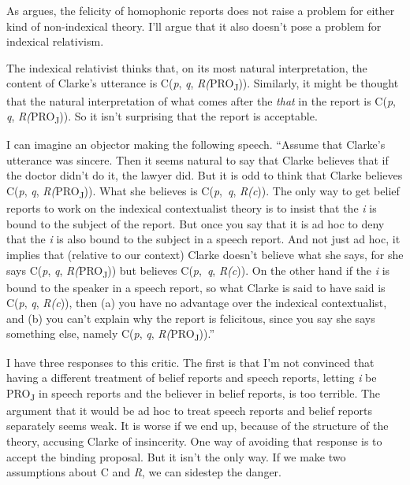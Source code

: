 As \cite{MacFarlane2009-MACNC} argues, the felicity of homophonic reports does not raise a problem for either kind of non-indexical theory. I'll argue that it also doesn't pose a problem for indexical relativism.

The indexical relativist thinks that, on its most natural interpretation, the content of Clarke's utterance is C(\textit{p}, \textit{q}, \textit{R(}PRO\textsubscript{J})). Similarly, it might be thought that the natural interpretation of what comes after the \textit{that} in the report is C(\textit{p}, \textit{q}, \textit{R(}PRO\textsubscript{J})). So it isn't surprising that the report is acceptable.

I can imagine an objector making the following speech. ``Assume that Clarke's utterance was sincere. Then it seems natural to say that Clarke believes that if the doctor didn't do it, the lawyer did. But it is odd to think that Clarke believes C(\textit{p}, \textit{q}, \textit{R(}PRO\textsubscript{J})). What she believes is C(\textit{p},~\textit{q}, \textit{R(c})). The only way to get belief reports to work on the indexical contextualist theory is to insist that the \textit{i} is bound to the subject of the report. But once you say that it is ad hoc to deny that the \textit{i} is also bound to the subject in a speech report. And not just ad hoc, it implies that (relative to our context) Clarke doesn't believe what she says, for she says C(\textit{p}, \textit{q}, \textit{R(}PRO\textsubscript{J})) but believes C(\textit{p},~\textit{q}, \textit{R(c})). On the other hand if the \textit{i} is bound to the speaker in a speech report, so what Clarke is said to have said is C(\textit{p}, \textit{q}, \textit{R(c})), then (a) you have no advantage over the indexical contextualist, and (b) you can't explain why the report is felicitous, since you say she says something else, namely C(\textit{p}, \textit{q}, \textit{R(}PRO\textsubscript{J})).''

I have three responses to this critic. The first is that I'm not convinced that having a different treatment of belief reports and speech reports, letting \textit{i} be PRO\textsubscript{J} in speech reports and the believer in belief reports, is too terrible. The argument that it would be ad hoc to treat speech reports and belief reports separately seems weak. It is worse if we end up, because of the structure of the theory, accusing Clarke of insincerity. One way of avoiding that response is to accept the binding proposal. But it isn't the only way. If we make two assumptions about C and \textit{R}, we can sidestep the danger. 

